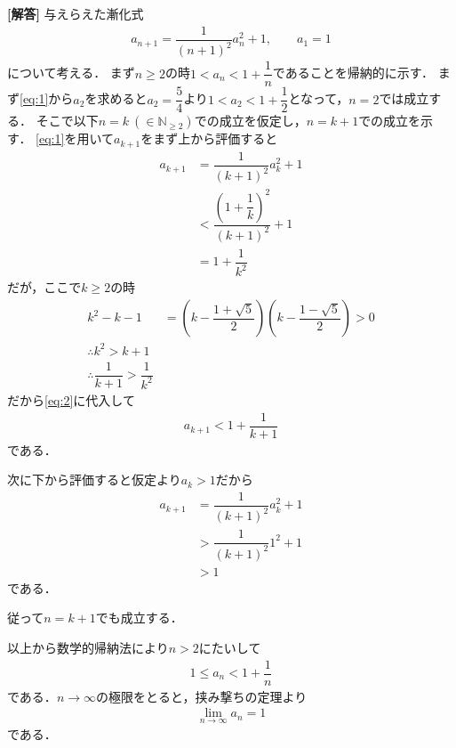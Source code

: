 \documentclass[../../main.tex]{subfiles}
\begin{document}
\begin{oframed}
  
\end{oframed}

{\bf [解答]}
与えらえた漸化式
\begin{align}
  a_{n+1}=\dfrac{1}{(n+1)^2}a_n^2+1, \qquad a_1=1 \label{eq:1}
\end{align}
について考える．
まず$n\ge2$の時$1<a_n<1+\dfrac{1}{n}$であることを帰納的に示す．
まず\cref{eq:1}から$a_2$を求めると$a_2=\dfrac{5}{4}$より$1<a_2<1+\dfrac{1}{2}$となって，$n=2$では成立する．
そこで以下$n=k\ (\in\mathbb{N}_{\ge2})$での成立を仮定し，$n=k+1$での成立を示す．
\cref{eq:1}を用いて$a_{k+1}$をまず上から評価すると
\begin{align}
  a_{k+1}
  &= \dfrac{1}{(k+1)^2}a_k^2+1 \\
  &<\dfrac{\left(1+\dfrac{1}{k}\right)^2}{(k+1)^2}+1 \\
  &=1+\dfrac{1}{k^2} \label{eq:2}
\end{align}
だが，ここで$k \ge 2$の時
\begin{align}
  k^2-k-1&=\left(k-\dfrac{1+\sqrt{5}}{2}\right)\left(k-\dfrac{1-\sqrt{5}}{2}\right) > 0 \\
  \therefore
  k^2 > k+1 \\
  \therefore
  \dfrac{1}{k+1} > \dfrac{1}{k^2}
\end{align}
だから\cref{eq:2}に代入して
\begin{align}
  a_{k+1} < 1+\dfrac{1}{k+1}
\end{align}
である．

次に下から評価すると仮定より$a_{k}>1$だから
\begin{align}
  a_{k+1}
  &= \dfrac{1}{(k+1)^2}a_k^2+1 \\
  &> \dfrac{1}{(k+1)^2}1^2+1 \\
  &> 1
\end{align}
である．

従って$n=k+1$でも成立する．

以上から数学的帰納法により$n>2$にたいして
\begin{align}
  1\le a_n<1+\dfrac{1}{n}
\end{align}
である．$n\to\infty$の極限をとると，挟み撃ちの定理より
\begin{align}
  \lim_{n\to\infty} a_n = 1
\end{align}
である．

\newpage
\end{document}
